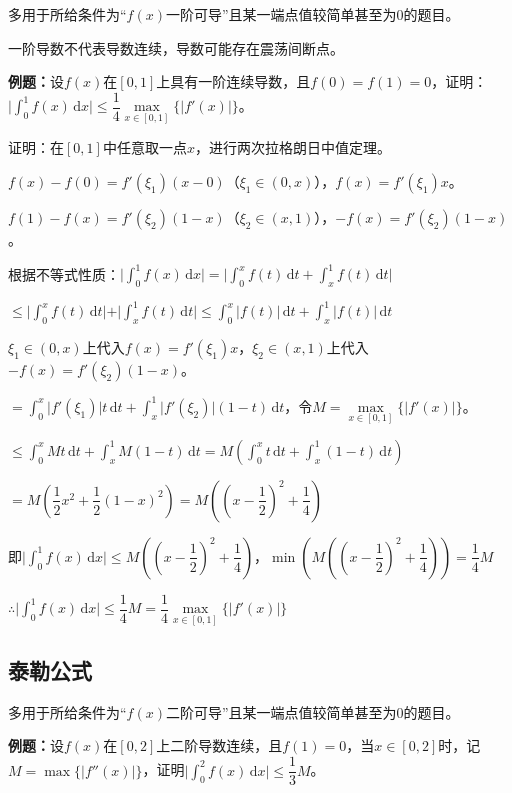 \documentclass[UTF8, 12pt]{ctexart}
\begin{document}
多用于所给条件为“$f(x)$一阶可导”且某一端点值较简单甚至为0的题目。

一阶导数不代表导数连续，导数可能存在震荡间断点。

\textbf{例题：}设$f(x)$在$[0,1]$上具有一阶连续导数，且$f(0)=f(1)=0$，证明：$\vert\int_0^1f(x)\,\textrm{d}x\vert\leqslant\dfrac{1}{4}\max\limits_{x\in[0,1]}\{\vert f'(x)\vert\}$。

证明：在$[0,1]$中任意取一点$x$，进行两次拉格朗日中值定理。

$f(x)-f(0)=f'(\xi_1)(x-0)$（$\xi_1\in(0,x)$），$f(x)=f'(\xi_1)x$。

$f(1)-f(x)=f'(\xi_2)(1-x)$（$\xi_2\in(x,1)$），$-f(x)=f'(\xi_2)(1-x)$。

根据不等式性质：$\vert\int_0^1f(x)\,\textrm{d}x\vert=\vert\int_0^xf(t)\,\textrm{d}t+\int_x^1f(t)\,\textrm{d}t\vert$

$\leqslant\vert\int_0^xf(t)\,\textrm{d}t\vert+\vert\int_x^1f(t)\,\textrm{d}t\vert\leqslant\int_0^x\vert f(t)\vert\,\textrm{d}t+\int_x^1\vert f(t)\vert\,\textrm{d}t$

$\xi_1\in(0,x)$上代入$f(x)=f'(\xi_1)x$，$\xi_2\in(x,1)$上代入$-f(x)=f'(\xi_2)(1-x)$。

$=\int_0^x\vert f'(\xi_1)\vert t\,\textrm{d}t+\int_x^1\vert f'(\xi_2)\vert(1-t)\,\textrm{d}t$，令$M=\max\limits_{x\in[0,1]}\{\vert f'(x)\vert\}$。

$\leqslant\int_0^xMt\,\textrm{d}t+\int_x^1M(1-t)\,\textrm{d}t=M\left(\int_0^xt\,\textrm{d}t+\int_x^1(1-t)\,\textrm{d}t\right)$

$=M\left(\dfrac{1}{2}x^2+\dfrac{1}{2}(1-x)^2\right)=M\left(\left(x-\dfrac{1}{2}\right)^2+\dfrac{1}{4}\right)$

即$\vert\int_0^1f(x)\,\textrm{d}x\vert\leqslant M\left(\left(x-\dfrac{1}{2}\right)^2+\dfrac{1}{4}\right)$，$\min\left(M\left(\left(x-\dfrac{1}{2}\right)^2+\dfrac{1}{4}\right)\right)=\dfrac{1}{4}M$

$\therefore\vert\int_0^1f(x)\,\textrm{d}x\vert\leqslant\dfrac{1}{4}M=\dfrac{1}{4}\max\limits_{x\in[0,1]}\{\vert f'(x)\vert\}$

\subsection{泰勒公式}

多用于所给条件为“$f(x)$二阶可导”且某一端点值较简单甚至为0的题目。

\textbf{例题：}设$f(x)$在$[0,2]$上二阶导数连续，且$f(1)=0$，当$x\in[0,2]$时，记$M=\max\{\vert f''(x)\vert\}$，证明$\vert\int_0^2f(x)\,\textrm{d}x\vert\leqslant\dfrac{1}{3}M$。
\end{document}
